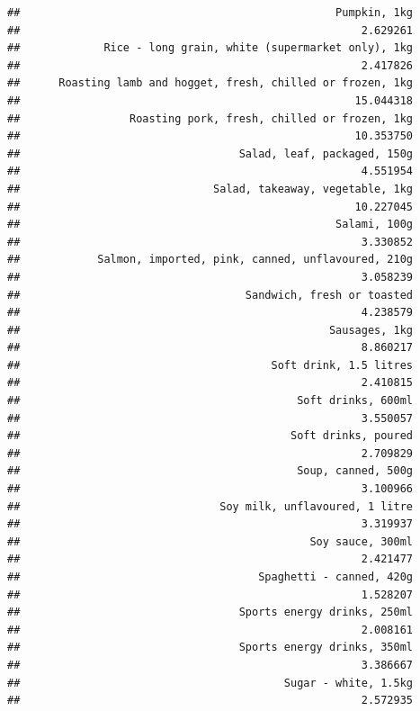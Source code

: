 \documentclass[
  landscape]{article}
\begin{document}
\begin{verbatim}
##                                                 Pumpkin, 1kg 
##                                                     2.629261 
##             Rice - long grain, white (supermarket only), 1kg 
##                                                     2.417826 
##      Roasting lamb and hogget, fresh, chilled or frozen, 1kg 
##                                                    15.044318 
##                 Roasting pork, fresh, chilled or frozen, 1kg 
##                                                    10.353750 
##                                  Salad, leaf, packaged, 150g 
##                                                     4.551954 
##                              Salad, takeaway, vegetable, 1kg 
##                                                    10.227045 
##                                                 Salami, 100g 
##                                                     3.330852 
##            Salmon, imported, pink, canned, unflavoured, 210g 
##                                                     3.058239 
##                                   Sandwich, fresh or toasted 
##                                                     4.238579 
##                                                Sausages, 1kg 
##                                                     8.860217 
##                                       Soft drink, 1.5 litres 
##                                                     2.410815 
##                                           Soft drinks, 600ml 
##                                                     3.550057 
##                                          Soft drinks, poured 
##                                                     2.709829 
##                                           Soup, canned, 500g 
##                                                     3.100966 
##                               Soy milk, unflavoured, 1 litre 
##                                                     3.319937 
##                                             Soy sauce, 300ml 
##                                                     2.421477 
##                                     Spaghetti - canned, 420g 
##                                                     1.528207 
##                                  Sports energy drinks, 250ml 
##                                                     2.008161 
##                                  Sports energy drinks, 350ml 
##                                                     3.386667 
##                                         Sugar - white, 1.5kg 
##                                                     2.572935 

\end{verbatim}
\end{document}
